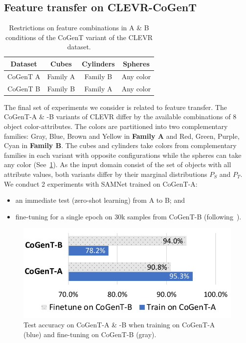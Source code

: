 \subsection{Feature transfer on CLEVR-CoGenT}
\label{sec:feature}
\begin{table}[ht]
	\centering
		\begin{tabular}{cccc}
			\toprule
			Dataset	& Cubes	& Cylinders &	Spheres	\\
			\midrule
			CoGenT A &  Family A  & Family B 	&	Any color  \\
			CoGenT B	&	Family B  &	Family A	&	Any color \\
			\bottomrule
		\end{tabular}
	\caption{Restrictions on feature combinations in A \& B conditions of the CoGenT variant of the CLEVR dataset.}
	\label{tab:cogent_conditions}
\end{table}

The final set of experiments we consider is related to feature transfer.
The CoGenT-A \& -B variants of CLEVR differ by the available combinations of 8 object color-attributes.
The colors are partitioned into two complementary families: 
Gray, Blue, Brown and Yellow in \textbf{Family A} and Red, Green, Purple, Cyan in \textbf{Family B}. 
The cubes and cylinders take colors from complementary families in each variant with opposite configurations while the spheres can take any color (See~\cref{tab:cogent_conditions}). 
As the input domain consist of the set of objects with all attribute values, both variants differ by their marginal distributions $P_S$ and $P_T$.
We conduct 2 experiments with SAMNet trained on CoGenT-A:
\begin{itemize}
\item an immediate test (zero-shot learning) from A to B; and 
\item fine-tuning for a single epoch on 30k samples from CoGenT-B (following~\cite{johnson2017inferring, mascharka2018transparency, perez2018film, marois2018transfer}).
\end{itemize}

\begin{figure}[!t]
	\centering
	\includegraphics[width=0.8\columnwidth]{img/results/CoGenT_B_results.pdf}
	\caption{Test accuracy on CoGenT-A \& -B when training on CoGenT-A (blue) and fine-tuning on CoGenT-B (gray).}
	\label{fig:CoGenT-B-results}
\end{figure}

